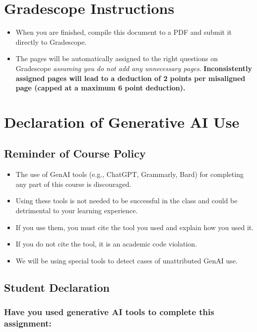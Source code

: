 \section*{ Gradescope Instructions}
\begin{itemize}
  \item When you are finished, compile this document to a PDF and submit it directly to Gradescope. 
  \item The pages will be automatically assigned to the right questions on Gradescope \textit{assuming you do not add any unnecessary pages}. \textbf{Inconsistently assigned pages will lead to a deduction of 2 points per misaligned page (capped at a maximum 6 point deduction).}
\end{itemize}
\pagebreak



\pagebreak

\section*{Declaration of Generative AI Use}

\subsection*{Reminder of Course Policy}

\begin{itemize}
    \item The use of GenAI tools (e.g., ChatGPT, Grammarly, Bard) for completing any part of this course is discouraged.
    \item Using these tools is not needed to be successful in the class and could be detrimental to your learning experience.
    \item If you use them, you must cite the tool you used and explain how you used it.
    \item If you do not cite the tool, it is an academic code violation.
    \item We will be using special tools to detect cases of unattributed GenAI use.
\end{itemize}

\subsection*{Student Declaration}

\subsubsection*{Have you used generative AI tools to complete this assignment:}

